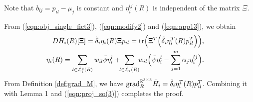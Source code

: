 \documentclass[conference,letterpaper]{ieeeconf}
\newcommand{\grad}{{\rm grad}}
\newcommand{\R}{{\mathbb R}}
\newcommand{\tr}{{\rm tr}}
\renewcommand{\L}{{\cal L}}
\begin{document}
Note that $b_{lj} = p_{il} - \mu_j$ is constant and 
$\eta_{i}^{lj}(R)$ is independent of the matrix $\Xi$.



From (\ref{eqn:obj_single_fict3}), (\ref{eqn:modify2}) and (\ref{eqn:app13}),
we obtain
\begin{eqnarray}
\hspace{-.8cm}&&D\bar H_i(R)[\Xi] = \tilde \delta_i 
\eta_i(R) \Xi p_{il}
=\tr \Big(\Xi^T \Big(\tilde \delta_i
\eta_i^T(R) p_{il}^T \Big)\Big),
\nonumber\\
\hspace{-.8cm}&&\eta_i(R) =
\sum_{l \in \tilde \L_i^c(R)}w_{il}
\bar{\phi}  \eta_i^l+\!\!
\sum_{l \in \tilde \L_i(R)}\!\! w_{il}
\Big(
\bar{\psi} \eta_i^l
- \sum_{j=1}^m \alpha_j \eta_{i}^{lj}
\Big).
\nonumber
\end{eqnarray}
From Definition \ref{def:grad_M},
we have
$\grad_{R}^{\R^{3\times 3}}\bar H_i = \tilde \delta_i \eta_i^T(R) p_{il}^T$.
Combining it with Lemma 1 and
(\ref{eqn:proj_so(3)}) completes the proof.
\end{document}
